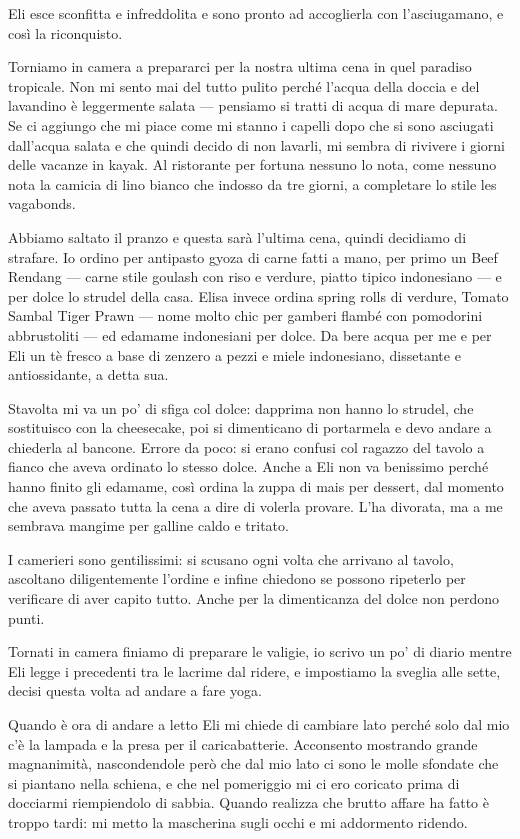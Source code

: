Eli esce sconfitta e infreddolita e sono pronto ad accoglierla con l'asciugamano, e così la riconquisto.

Torniamo in camera a prepararci per la nostra ultima cena in quel paradiso tropicale. Non mi sento mai del tutto pulito perché l'acqua della doccia e del lavandino è leggermente salata — pensiamo si tratti di acqua di mare depurata. Se ci aggiungo che mi piace come mi stanno i capelli dopo che si sono asciugati dall'acqua salata e che quindi decido di non lavarli, mi sembra di rivivere i giorni delle vacanze in kayak. Al ristorante per fortuna nessuno lo nota, come nessuno nota la camicia di lino bianco che indosso da tre giorni, a completare lo stile les vagabonds.

Abbiamo saltato il pranzo e questa sarà l'ultima cena, quindi decidiamo di strafare. Io ordino per antipasto gyoza di carne fatti a mano, per primo un Beef Rendang — carne stile goulash con riso e verdure, piatto tipico indonesiano — e per dolce lo strudel della casa. Elisa invece ordina spring rolls di verdure, Tomato Sambal Tiger Prawn — nome molto chic per gamberi flambé con pomodorini abbrustoliti — ed edamame indonesiani per dolce. Da bere acqua per me e per Eli un tè fresco a base di zenzero a pezzi e miele indonesiano, dissetante e antiossidante, a detta sua.

Stavolta mi va un po' di sfiga col dolce: dapprima non hanno lo strudel, che sostituisco con la cheesecake, poi si dimenticano di portarmela e devo andare a chiederla al bancone. Errore da poco: si erano confusi col ragazzo del tavolo a fianco che aveva ordinato lo stesso dolce. Anche a Eli non va benissimo perché hanno finito gli edamame, così ordina la zuppa di mais per dessert, dal momento che aveva passato tutta la cena a dire di volerla provare. L'ha divorata, ma a me sembrava mangime per galline caldo e tritato.

I camerieri sono gentilissimi: si scusano ogni volta che arrivano al tavolo, ascoltano diligentemente l'ordine e infine chiedono se possono ripeterlo per verificare di aver capito tutto. Anche per la dimenticanza del dolce non perdono punti.

Tornati in camera finiamo di preparare le valigie, io scrivo un po' di diario mentre Eli legge i precedenti tra le lacrime dal ridere, e impostiamo la sveglia alle sette, decisi questa volta ad andare a fare yoga.

Quando è ora di andare a letto Eli mi chiede di cambiare lato perché solo dal mio c'è la lampada e la presa per il caricabatterie. Acconsento mostrando grande magnanimità, nascondendole però che dal mio lato ci sono le molle sfondate che si piantano nella schiena, e che nel pomeriggio mi ci ero coricato prima di docciarmi riempiendolo di sabbia. Quando realizza che brutto affare ha fatto è troppo tardi: mi metto la mascherina sugli occhi e mi addormento ridendo.


